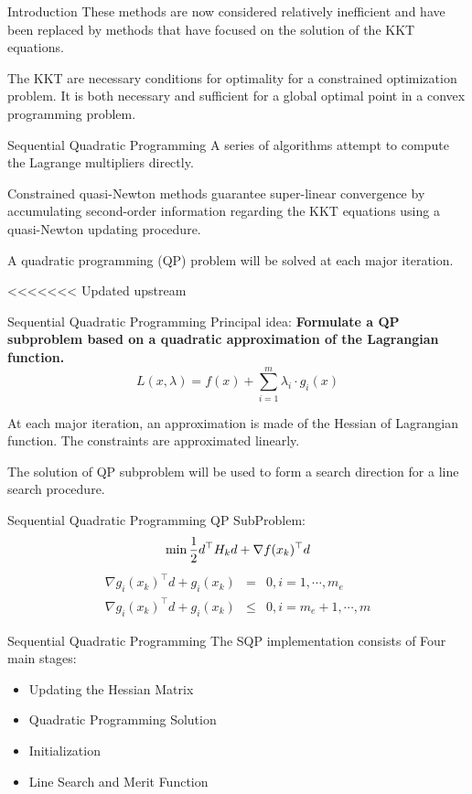 \documentclass[10pt, compress]{beamer}
\begin{document}
\begin{frame}[fragile]{Introduction}
These methods are now considered relatively inefficient and have been replaced by methods that have focused on the solution of the KKT equations.

The KKT are necessary conditions for optimality for a constrained optimization problem. It is both necessary and sufficient for a global optimal point in a convex programming problem. 
\end{frame}

\begin{frame}[fragile]{Sequential Quadratic Programming}
A series of algorithms attempt to compute the Lagrange multipliers directly.

Constrained quasi-Newton methods guarantee super-linear convergence by accumulating second-order information regarding the KKT equations using a quasi-Newton updating procedure.

A quadratic programming (QP) problem will be solved at each major iteration.
\end{frame}

<<<<<<< Updated upstream
\begin{frame}[fragile]{Sequential Quadratic Programming}
Principal idea: \textbf{Formulate a QP subproblem based on a quadratic approximation of the Lagrangian function.}
$$L(x, \lambda) = f(x) + \sum_{i=1}^m \lambda_i \cdot g_i(x)$$

At each major iteration, an approximation is made of the Hessian of Lagrangian function. The constraints are approximated linearly. 

The solution of QP subproblem will be used to form a search direction for a line search procedure.
\end{frame}

\begin{frame}[fragile]{Sequential Quadratic Programming}
QP SubProblem:
$$ \min {1 \over 2} d^\top H_k d + \nabla f(x_k)^\top d$$
\begin{eqnarray*}
	\nabla g_i(x_k)^\top d + g_i(x_k) & = & 0, i = 1,\cdots, m_e \\
	\nabla g_i(x_k)^\top d + g_i(x_k) & \leq & 0, i = m_e+1,\cdots, m
\end{eqnarray*}
\end{frame}

\begin{frame}[fragile]{Sequential Quadratic Programming}
The SQP implementation consists of Four main stages:
\begin{itemize}
  \item Updating the Hessian Matrix
  \item Quadratic Programming Solution
  \item Initialization
  \item Line Search and Merit Function
\end{itemize}
\end{frame}
\end{document}
